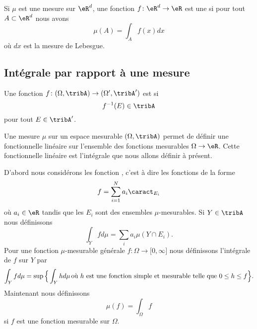 Si \( \mu\) est une mesure sur \( \eR^d\), une fonction \( f\colon \eR^d\to \eR\) est une  si pour tout \( A\subset\eR^d\) nous avons
\begin{equation}
    \mu(A)=\int_Af(x)dx
\end{equation}
où \( dx\) est la mesure de Lebesgue.

\subsection{Intégrale par rapport à une mesure}

Une fonction \( f\colon (\Omega,\tribA)\to (\Omega',\tribA')\) est  si 
\begin{equation}
    f^{-1}(E)\in\tribA
\end{equation}
pour tout \( E\in\tribA'\).


Une mesure \( \mu\) sur un espace mesurable \( (\Omega,\tribA)\) permet de définir une fonctionnelle linéaire sur l'ensemble des fonctions mesurables \( \Omega\to \eR\). Cette fonctionnelle linéaire est l'intégrale que nous allons définir à présent.

D'abord nous considérons les fonction , c'est à dire les fonctions de la forme
\begin{equation}
    f=\sum_{i=1}^Na_i\caract_{E_i}
\end{equation}
où \( a_i\in\eR\) tandis que les \( E_i\) sont des ensembles \( \mu\)-mesurables. Si \( Y\in \tribA\) nous définissons
\begin{equation}
    \int_Yfd\mu=\sum_ia_i\mu(Y\cap E_i).
\end{equation}
Pour une fonction \( \mu\)-mesurable générale \( f\colon \Omega\to \mathopen[ 0 , \infty \mathclose]\) nous définissons l'intégrale de \( f\) sur \( Y\) par
\begin{equation}        \label{EqDefintYfdmu}
    \int_Yfd\mu=\sup\Big\{ \int_Yhd\mu\,\text{où \( h\) est une fonction simple et mesurable telle que \( 0\leq h\leq f\)} \Big\}.
\end{equation}
Maintenant nous définissons
\begin{equation}
    \mu(f)=\int_{\Omega}f
\end{equation}
si \( f\) est une fonction mesurable sur \( \Omega\).


